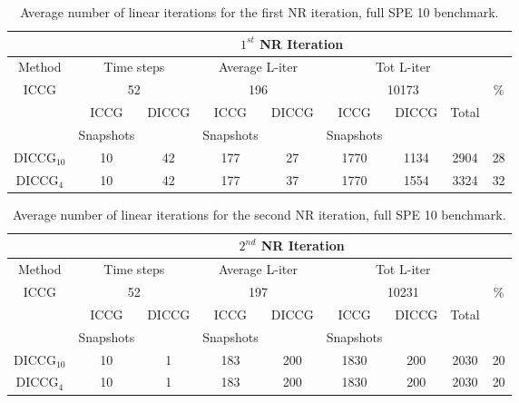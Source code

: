 \documentclass[12pt]{article}
\begin{document}
\begin{table}[!ht]\centering
\begin{minipage}{1\textwidth}
\vspace{-10pt}
\centering
\begin{tabular}{ |c|c|c|c|c|c|c|c|c|} 
  \hline
  & \multicolumn{8}{|c|}{$1^{st}$ NR Iteration}  \\
\hline
Method&  \multicolumn{2}{|c|}{Time steps} &\multicolumn{2}{|c|}{Average L-iter} & \multicolumn{3}{|c|}{Tot L-iter}&\\
\hline
 ICCG&\multicolumn{2}{|c|}{52} & \multicolumn{2}{|c|}{196}& \multicolumn{3}{|c|}{10173} &\%\\
\hline
&ICCG&DICCG&ICCG&DICCG&ICCG&DICCG&Total&\\
&Snapshots&&Snapshots&&Snapshots&&&\\
\hline
DICCG$_{10}$&10&42&177&27&1770&1134&2904&28 \\
DICCG$_4$ &10&42&177&37&1770&1554&3324&32  \\
\hline
 \end{tabular}
\caption{Average number of linear iterations for the first NR iteration, full SPE 10 benchmark.}\label{table:literspe1}
\end{minipage}
\end{table}


\begin{table}[!ht]\centering
\begin{minipage}{1\textwidth}
\vspace{-10pt}
\centering
\begin{tabular}{ |c|c|c|c|c|c|c|c|c|} 
  \hline
  & \multicolumn{8}{|c|}{$2^{nd}$ NR Iteration}  \\
\hline
Method&  \multicolumn{2}{|c|}{Time steps} &\multicolumn{2}{|c|}{Average L-iter} & \multicolumn{3}{|c|}{Tot L-iter}&\\
\hline
 ICCG&\multicolumn{2}{|c|}{52} & \multicolumn{2}{|c|}{197}& \multicolumn{3}{|c|}{10231} &\%\\
\hline
&ICCG&DICCG&ICCG&DICCG&ICCG&DICCG&Total&\\
&Snapshots&&Snapshots&&Snapshots&&&\\
\hline
DICCG$_{10}$&10&1&183&200&1830&200&2030&20 \\
DICCG$_4$ &10&1&183&200&1830&200&2030&20 \\

\hline
 \end{tabular}
\caption{Average number of linear iterations for the second NR iteration, full SPE 10 benchmark.}\label{table:literspe1}
\end{minipage}
\end{table}
\end{document}

